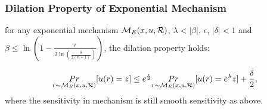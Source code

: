 \subsubsection{Dilation Property of Exponential Mechanism}
\begin{lem}
for any exponential mechanism $\mathcal{M}_E(x, u, \mathcal{R})$, $\lambda < |\beta|$, $\epsilon$, $|\delta| < 1$ and $\beta \leq \ln(1 - \frac{\epsilon}{2 \ln (\frac{\delta}{2 (n + 1)})})$, the dilation property holds:

\begin{equation*}
\underset{r \thicksim \mathcal{M}_E(x, u, \mathcal{R})}{Pr}[u(r) = z]
\leq
e^{\frac{\epsilon}{2}} \underset{r \thicksim \mathcal{M}_E(x, u, \mathcal{R})}{Pr}[u(r) = e^{\lambda} z] + \frac{\delta}{2},
\end{equation*}
where the sensitivity in mechanism is still smooth sensitivity as above.
\end{lem}

